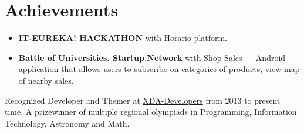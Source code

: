 \documentclass[a4paper]{article}
\begin{document}
	\section*{Achievements}
	\begin{itemize}
		\item \textbf{IT-EUREKA! HACKATHON} with Horario platform.
		\item \textbf{Battle of Universities. Startup.Network} with Shop Sales --- Android application that allows users to subscribe on categories of products, view map of nearby sales.
	\end{itemize}
	Recognized Developer and Themer at \href{https://forum.xda-developers.com/member.php?u=3685328}{XDA-Developers} from 2013 to present time.
	A prizewinner of multiple regional olympiads in Programming, Information Technology, Astronomy and Math.
\end{document}
